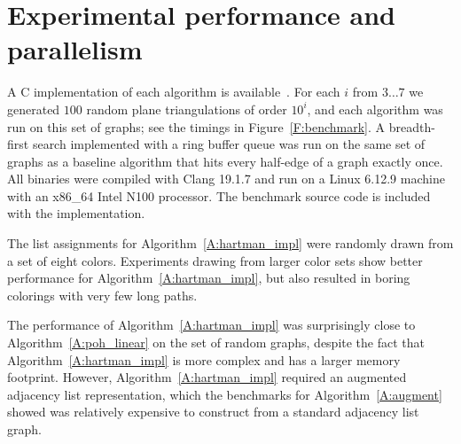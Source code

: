 \documentclass[12pt,letterpaper]{article}
\theoremstyle{plain}
\theoremstyle{definition}
\theoremstyle{break}
\begin{document}
\section{Experimental performance and parallelism}

A C implementation of each algorithm is available~\cite{Bro2017}.
For each $i$ from $3\ldots 7$ we generated $100$ random plane triangulations
of order $10^i$, and each algorithm was run on this set of graphs;
see the timings in Figure~\ref{F:benchmark}.
A breadth-first search implemented with
a ring buffer queue was run on the same set of graphs
as a baseline
algorithm that hits every half-edge of a graph exactly once.
All binaries 
were compiled with Clang 19.1.7 and run on a Linux 6.12.9 machine
with an x86\_64 Intel N100 processor.
The benchmark
source code is included with the implementation.

The list assignments for Algorithm~\ref{A:hartman_impl} were randomly
drawn from a set of eight colors. Experiments drawing from larger color sets
show better performance for Algorithm~\ref{A:hartman_impl}, but also
resulted in boring colorings with very few long paths.

The performance of
Algorithm~\ref{A:hartman_impl} was surprisingly close to
Algorithm~\ref{A:poh_linear} on the set of random graphs, despite the fact that
Algorithm~\ref{A:hartman_impl} is more complex and has a larger memory
footprint.
However, Algorithm~\ref{A:hartman_impl} required an augmented adjacency list
representation, which the benchmarks for Algorithm~\ref{A:augment} showed
was relatively expensive to construct from a standard adjacency list graph.
\end{document}
